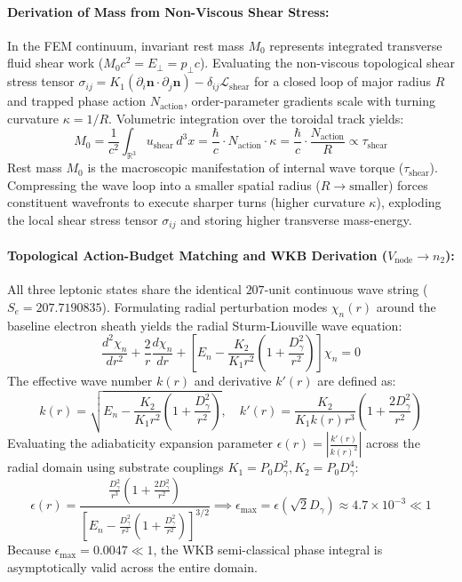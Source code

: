 \documentclass[11pt,a4paper]{article}
\begin{document}
	\paragraph{Derivation of Mass from Non-Viscous Shear Stress:}
	In the FEM continuum, invariant rest mass $M_0$ represents integrated transverse fluid shear work ($M_0 c^2 = E_\perp = p_\perp c$). Evaluating the non-viscous topological shear stress tensor $\sigma_{ij} = K_1 (\partial_i \mathbf{n} \cdot \partial_j \mathbf{n}) - \delta_{ij} \mathcal{L}_{\text{shear}}$ for a closed loop of major radius $R$ and trapped phase action $N_{\text{action}}$, order-parameter gradients scale with turning curvature $\kappa = 1/R$. Volumetric integration over the toroidal track yields:
	\begin{equation}
		M_0 = \frac{1}{c^2} \int_{\mathbb{R}^3} u_{\text{shear}} \, d^3x = \frac{\hbar}{c} \cdot N_{\text{action}} \cdot \kappa = \frac{\hbar}{c} \cdot \frac{N_{\text{action}}}{R} \propto \tau_{\text{shear}}
	\end{equation}
	Rest mass $M_0$ is the macroscopic manifestation of internal wave torque ($\tau_{\text{shear}}$). Compressing the wave loop into a smaller spatial radius ($R \to \text{smaller}$) forces constituent wavefronts to execute sharper turns (higher curvature $\kappa$), exploding the local shear stress tensor $\sigma_{ij}$ and storing higher transverse mass-energy.
	
	\paragraph{Topological Action-Budget Matching and WKB Derivation ($V_{\text{node}} \to n_2$):}
	All three leptonic states share the identical $207$-unit continuous wave string ($S_e = 207.7190835$). Formulating radial perturbation modes $\chi_n(r)$ around the baseline electron sheath yields the radial Sturm-Liouville wave equation:
	\begin{equation}
		\frac{d^2 \chi_n}{dr^2} + \frac{2}{r} \frac{d\chi_n}{dr} + \left[ E_n - \frac{K_2}{K_1 r^2} \left(1 + \frac{D_\gamma^2}{r^2}\right) \right] \chi_n = 0
	\end{equation}
	The effective wave number $k(r)$ and derivative $k'(r)$ are defined as:
	\begin{equation}
		k(r) = \sqrt{E_n - \frac{K_2}{K_1 r^2}\left(1 + \frac{D_\gamma^2}{r^2}\right)}, \quad k'(r) = \frac{K_2}{K_1 k(r) r^3} \left(1 + \frac{2 D_\gamma^2}{r^2}\right)
	\end{equation}
	Evaluating the adiabaticity expansion parameter $\epsilon(r) = \left|\frac{k'(r)}{k(r)^2}\right|$ across the radial domain using substrate couplings $K_1 = P_0 D_\gamma^2, K_2 = P_0 D_\gamma^4$:
	\begin{equation}
		\epsilon(r) = \frac{\frac{D_\gamma^2}{r^3} \left(1 + \frac{2 D_\gamma^2}{r^2}\right)}{\left[ E_n - \frac{D_\gamma^2}{r^2}\left(1 + \frac{D_\gamma^2}{r^2}\right) \right]^{3/2}} \implies \epsilon_{\text{max}} = \epsilon(\sqrt{2}D_\gamma) \approx 4.7 \times 10^{-3} \ll 1
	\end{equation}
	Because $\epsilon_{\text{max}} = 0.0047 \ll 1$, the WKB semi-classical phase integral is asymptotically valid across the entire domain.
	
\end{document}
